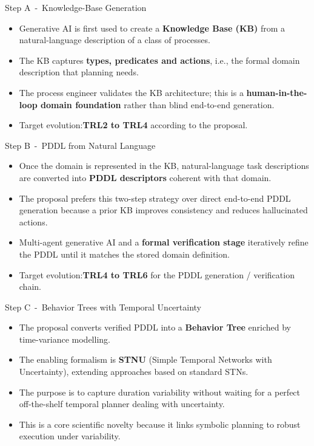\documentclass[aspectratio=169,10pt]{beamer}
\begin{document}
\begin{frame}{Step A~-~Knowledge-Base Generation}

\begin{itemize}
  \item Generative AI is first used to create a \textbf{Knowledge Base (KB)} from a natural-language description of a class of processes.
  \item The KB captures \textbf{types, predicates and actions}, i.e., the formal domain description that planning needs.
  \item The process engineer validates the KB architecture; this is a \textbf{human-in-the-loop domain foundation} rather than blind end-to-end generation.
  \item Target evolution:\@from \textbf{TRL2 to TRL4} according to the proposal.
\end{itemize}

\end{frame}


\begin{frame}{Step B~-~PDDL from Natural Language}

\begin{itemize}
  \item Once the domain is represented in the KB, natural-language task descriptions are converted into \textbf{PDDL descriptors} coherent with that domain.
  \item The proposal prefers this two-step strategy over direct end-to-end PDDL generation because a prior KB improves consistency and reduces hallucinated actions.
  \item Multi-agent generative AI and a \textbf{formal verification stage} iteratively refine the PDDL until it matches the stored domain definition.
  \item Target evolution:\@\textbf{TRL4 to TRL6} for the PDDL generation / verification chain.
\end{itemize}

\end{frame}


\begin{frame}{Step C~-~Behavior Trees with Temporal Uncertainty}

\begin{itemize}
  \item The proposal converts verified PDDL into a \textbf{Behavior Tree} enriched by time-variance modelling.
  \item The enabling formalism is \textbf{STNU} (Simple Temporal Networks with Uncertainty), extending approaches based on standard STNs.
  \item The purpose is to capture duration variability without waiting for a perfect off-the-shelf temporal planner dealing with uncertainty.
  \item This is a core scientific novelty because it links symbolic planning to robust execution under variability.
\end{itemize}

\end{frame}
\end{document}
